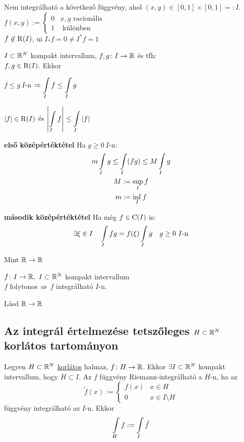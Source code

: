 \begin{pl}Nem integrálható a következő függvény, ahol $(x,y)\in [0,1]\times[0,1]=:I$.\\
  $f(x,y):=\begin{cases}0 & x,y \text{ racionális }\\1 &\text{ különben}\end{cases}$\\
  $f\not\in\operatorname{R}(I)$, ui $I_*f=0\neq I^*f=1$
\end{pl}
\begin{te}[Egyenlőtlenség]$I\subset\mathbb{R}^N$ kompakt intervallum, $f,g\colon I\to\mathbb{R}$ és tfh:\\$f,g\in\operatorname{R}(I)$. Ekkor
  \begin{enumzjb}
    \item $f\leq g\ I$-n $\di\nn \Int_If\leq \Int_Ig$
    \item $\vert f\vert\in\operatorname{R}(I)$ és $\di\left\vert\Int_If\right\vert\leq\Int_I\vert f\vert$
    \item \textbf{első középértéktétel} Ha $g\geq 0\ I$-n:
      \begin{gather*}
	m\Int_Ig\leq \Int_I(fg)\leq M\Int_Ig\\
	M:=\sup_If\\
	m:=\inf_If
      \end{gather*}
    \item \textbf{második középértéktétel} Ha  még $f\in\operatorname{C}(I)$ is:
      \[\exists \xi \in I\quad \Int_I fg = f(\xi)\Int_Ig\quad g\geq 0\ I\text{-n}\]
  \end{enumzjb}
\end{te}
\begin{biz}Mint $\mathbb{R}\to\mathbb{R}$\end{biz}

\begin{te}$f\colon I\to\mathbb{R},\ I\subset\mathbb{R}^N$ kompakt intervallum\\
  $f$ folytonos $\Rightarrow$ $f$ integrálható $I$-n.
\end{te}
\begin{biz}Lásd $\mathbb{R}\to\mathbb{R}$\end{biz}

\subsection{Az integrál értelmezése tetszőleges $H\subset \mathbb{R}^N$ korlátos tartományon}
\begin{de}Legyen $H\subset\mathbb{R}^N$ \underline{korlátos} halmaz, $f\colon H\to\mathbb{R}$. Ekkor $\exists I\subset\mathbb{R}^N$ kompakt
  intervallum, hogy $H\subset I$. Az $f$ függvény Riemann-integrálható a $H$-n, ha az
\[ \tilde{f}(x) := \begin{cases}f(x)& x\in H\\0& x\in I\setminus H \end{cases}\]
függvény integrálható az $I$-n. Ekkor
\[ \Int_Hf := \Int_I\tilde{f}\]
\end{de}

